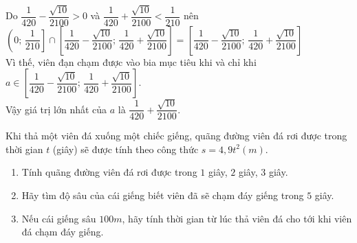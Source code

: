 \begin{bt}
{		Do $\dfrac{1}{420}-\dfrac{\sqrt{10}}{2100}>0$ và $\dfrac{1}{420}+\dfrac{\sqrt{10}}{2100}<\dfrac{1}{210}$ nên\\
		$\left(0;\,\dfrac{1}{210}\right]\cap\left[\dfrac{1}{420}-\dfrac{\sqrt{10}}{2100};\,\dfrac{1}{420}+\dfrac{\sqrt{10}}{2100}\right]=\left[\dfrac{1}{420}-\dfrac{\sqrt{10}}{2100};\,\dfrac{1}{420}+\dfrac{\sqrt{10}}{2100}\right]$\\
		Vì thế, viên đạn chạm được vào bia mục tiêu khi và chỉ khi $a\in\left[\dfrac{1}{420}-\dfrac{\sqrt{10}}{2100};\,\dfrac{1}{420}+\dfrac{\sqrt{10}}{2100}\right]$.\\
		Vậy giá trị lớn nhất của $a$ là $\dfrac{1}{420}+\dfrac{\sqrt{10}}{2100}$.}
\end{bt}

\begin{bt}%
	Khi thả một viên đá xuống một chiếc giếng, quãng đường viên đá rơi được trong thời gian $t$ (giây) sẽ được tính theo công thức $s=4{,}9 t^{2}({m})$.
	\begin{enumerate}
		\item Tính quãng đường viên đá rơi được trong $ 1 $ giây, $ 2 $ giây, $ 3 $ giây.
		\item Hãy tìm độ sâu của cái giếng biết viên đã sẽ chạm đáy giếng trong $ 5 $ giây.
		\item Nếu cái giếng sâu $100m$, hãy tính thời gian từ lúc thả viên đá cho tới khi viên đá chạm đáy giếng.
	\end{enumerate} 
\end{bt}

